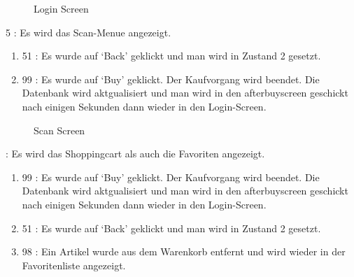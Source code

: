 \documentclass[11pt,a4paper]{article} %
\begin{document}
\begin{figure}[h]
	\caption{Login Screen}
	\end{figure}		
		5 : Es wird das Scan-Menue angezeigt.
\begin{enumerate}		
			\item	51 : Es wurde auf `Back' geklickt und man wird in Zustand 2 gesetzt.
			\item	99 : Es wurde auf `Buy' geklickt. Der Kaufvorgang wird beendet. Die Datenbank wird aktgualisiert und man wird in den afterbuyscreen geschickt nach einigen 						Sekunden dann wieder in den Login-Screen.
\end{enumerate}		
\begin{figure}[h]
	\caption{Scan Screen}
	\end{figure}
	 : Es wird das Shoppingcart als auch die Favoriten angezeigt.
\begin{enumerate}		
			\item	99 : Es wurde auf `Buy' geklickt. Der Kaufvorgang wird beendet. Die Datenbank wird aktgualisiert und man wird in den afterbuyscreen geschickt nach einigen 						Sekunden dann wieder in den Login-Screen.
			\item	51 : Es wurde auf `Back' geklickt und man wird in Zustand 2 gesetzt.
			\item	98 : Ein Artikel wurde aus dem Warenkorb entfernt und wird wieder in der Favoritenliste angezeigt.
\end{enumerate}				
\end{document}
